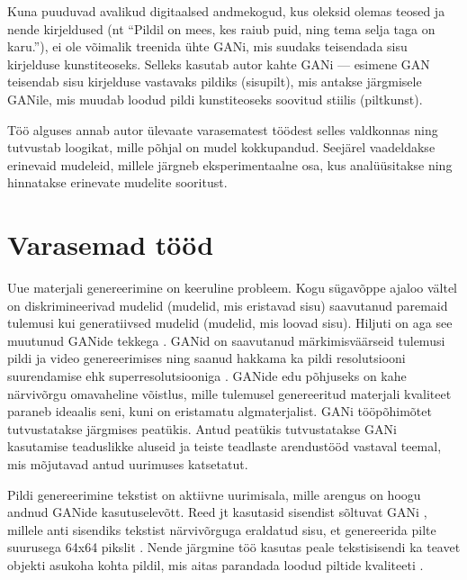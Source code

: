 \documentclass{vilgym}
\begin{document}
	Kuna puuduvad avalikud digitaalsed andmekogud, kus oleksid olemas teosed ja nende kirjeldused (nt \enquote{Pildil on mees, kes raiub puid, ning tema selja taga on karu.}), ei ole võimalik treenida ühte GANi, mis suudaks teisendada sisu kirjelduse kunstiteoseks. Selleks kasutab autor kahte GANi --- esimene GAN teisendab sisu kirjelduse vastavaks pildiks (sisu\textrightarrow pilt), mis antakse järgmisele GANile, mis muudab loodud pildi kunstiteoseks soovitud stiilis (pilt\textrightarrow kunst).


	Töö alguses annab autor ülevaate varasematest töödest selles valdkonnas ning tutvustab loogikat, mille põhjal on mudel kokkupandud. Seejärel vaadeldakse erinevaid mudeleid, millele järgneb eksperimentaalne osa, kus analüüsitakse ning hinnatakse erinevate mudelite sooritust. 
	
	\section{Varasemad tööd}

	Uue materjali genereerimine on keeruline probleem. Kogu sügavõppe ajaloo vältel on diskrimineerivad mudelid (mudelid, mis eristavad sisu) saavutanud paremaid tulemusi kui generatiivsed mudelid (mudelid, mis loovad sisu). Hiljuti on aga see muutunud GANide tekkega \parencite{gan}. GANid on saavutanud märkimisväärseid tulemusi pildi \parencite{biggan} ja video genereerimises \parencite{dvdgan} ning saanud hakkama ka pildi resolutsiooni suurendamise ehk superresolutsiooniga \parencite{srgan}. GANide edu põhjuseks on kahe närvivõrgu omavaheline võistlus, mille tulemusel genereeritud materjali kvaliteet paraneb ideaalis seni, kuni on eristamatu algmaterjalist. GANi tööpõhimõtet tutvustatakse järgmises peatükis. Antud peatükis tutvustatakse GANi kasutamise teaduslikke aluseid ja teiste teadlaste arendustööd vastaval teemal, mis mõjutavad antud uurimuses katsetatut. 

	Pildi genereerimine tekstist on aktiivne uurimisala, mille arengus on hoogu andnud GANide kasutuselevõtt. Reed jt kasutasid sisendist sõltuvat GANi , millele anti sisendiks tekstist närvivõrguga eraldatud sisu, et genereerida pilte suurusega 64x64 pikslit \parencite{reed}. Nende järgmine töö kasutas peale tekstisisendi ka teavet objekti asukoha kohta pildil, mis aitas parandada loodud piltide kvaliteeti \parencite{reed2}. 
\end{document}
